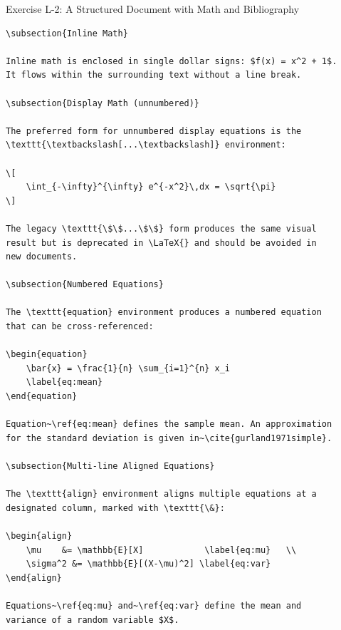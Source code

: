 \begin{infobox}{Exercise L-2: A Structured Document with Math and Bibliography}
\begin{lstlisting}[style=inlineStyle]
\subsection{Inline Math}

Inline math is enclosed in single dollar signs: $f(x) = x^2 + 1$.
It flows within the surrounding text without a line break.

\subsection{Display Math (unnumbered)}

The preferred form for unnumbered display equations is the
\texttt{\textbackslash[...\textbackslash]} environment:

\[
    \int_{-\infty}^{\infty} e^{-x^2}\,dx = \sqrt{\pi}
\]

The legacy \texttt{\$\$...\$\$} form produces the same visual
result but is deprecated in \LaTeX{} and should be avoided in
new documents.

\subsection{Numbered Equations}

The \texttt{equation} environment produces a numbered equation
that can be cross-referenced:

\begin{equation}
    \bar{x} = \frac{1}{n} \sum_{i=1}^{n} x_i
    \label{eq:mean}
\end{equation}

Equation~\ref{eq:mean} defines the sample mean. An approximation
for the standard deviation is given in~\cite{gurland1971simple}.

\subsection{Multi-line Aligned Equations}

The \texttt{align} environment aligns multiple equations at a
designated column, marked with \texttt{\&}:

\begin{align}
    \mu    &= \mathbb{E}[X]            \label{eq:mu}   \\
    \sigma^2 &= \mathbb{E}[(X-\mu)^2] \label{eq:var}
\end{align}

Equations~\ref{eq:mu} and~\ref{eq:var} define the mean and
variance of a random variable $X$.


\end{lstlisting}
\end{infobox}
